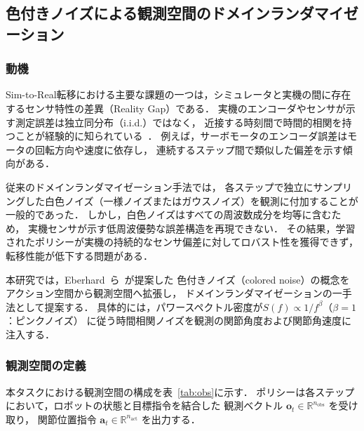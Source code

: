 %

\subsection{色付きノイズによる観測空間のドメインランダマイゼーション}
\label{sec:obs_pink_noise}

\subsubsection{動機}

Sim-to-Real転移における主要な課題の一つは，シミュレータと実機の間に存在するセンサ特性の差異（Reality Gap）である．
実機のエンコーダやセンサが示す測定誤差は独立同分布（i.i.d.）ではなく，
近接する時刻間で時間的相関を持つことが経験的に知られている~\cite{eberhard2023pink}．
例えば，サーボモータのエンコーダ誤差はモータの回転方向や速度に依存し，
連続するステップ間で類似した偏差を示す傾向がある．

従来のドメインランダマイゼーション手法では，
各ステップで独立にサンプリングした白色ノイズ（一様ノイズまたはガウスノイズ）を観測に付加することが一般的であった．
しかし，白色ノイズはすべての周波数成分を均等に含むため，
実機センサが示す低周波優勢な誤差構造を再現できない．
その結果，学習されたポリシーが実機の持続的なセンサ偏差に対してロバスト性を獲得できず，
転移性能が低下する問題がある．

本研究では，Eberhard~ら~\cite{eberhard2023pink}が提案した
色付きノイズ（colored noise）の概念をアクション空間から観測空間へ拡張し，
ドメインランダマイゼーションの一手法として提案する．
具体的には，パワースペクトル密度が$S(f) \propto 1/f^{\beta}$（$\beta = 1$：ピンクノイズ）
に従う時間相関ノイズを観測の関節角度および関節角速度に注入する．

\subsubsection{観測空間の定義}

本タスクにおける観測空間の構成を表~\ref{tab:obs}に示す．
ポリシーは各ステップにおいて，ロボットの状態と目標指令を結合した
観測ベクトル $\boldsymbol{o}_t \in \mathbb{R}^{n_\mathrm{obs}}$ を受け取り，
関節位置指令 $\boldsymbol{a}_t \in \mathbb{R}^{n_\mathrm{act}}$ を出力する．

